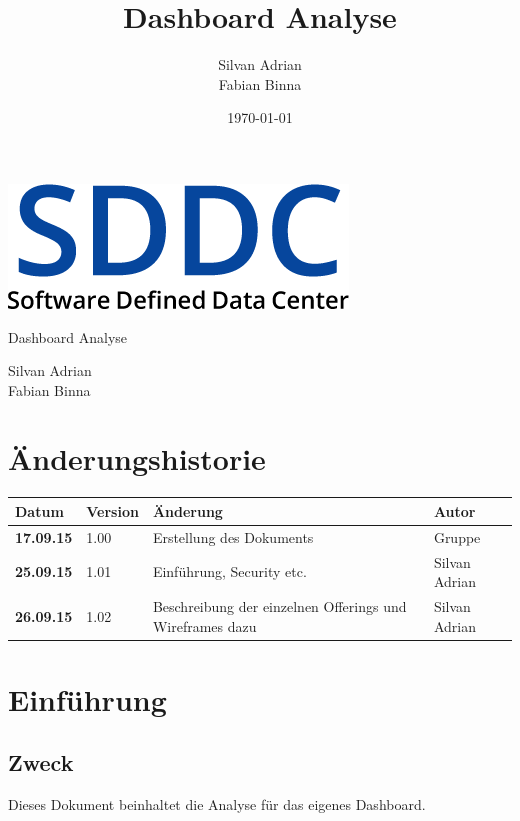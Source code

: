 \documentclass[11pt]{scrartcl}
\title{Dashboard Analyse}
\author{Silvan Adrian \\ Fabian Binna}
\date{\today{}}
\begin{document}
\def\arraystretch{1.5}
\begin{titlepage}
\begin{center}
\vspace{10em}
\includegraphics[scale=2]{SDDC}
\vspace{10em}
\end{center}
\begin{center}
\huge {Dashboard Analyse}
\end{center}
\begin{center}
\vspace{10em}
\LARGE {Silvan Adrian} \\
\LARGE {Fabian Binna}
\end{center}

\end{titlepage}

\newpage
\section{Änderungshistorie}
\begin{tabularx}{\linewidth}{l l X l}
\textbf{Datum} & \textbf{Version} & \textbf{Änderung}  & \textbf{Autor} \\
\hline
\textbf{17.09.15} & 1.00 & Erstellung des Dokuments & Gruppe \\
\textbf{25.09.15} & 1.01 & Einführung, Security etc. & Silvan Adrian \\
\textbf{26.09.15} & 1.02 & Beschreibung der einzelnen Offerings und Wireframes 
dazu & Silvan Adrian\\

\end{tabularx}

\newpage
\tableofcontents
\newpage

\section{Einführung}
\subsection{Zweck}
Dieses Dokument beinhaltet die Analyse für das eigenes Dashboard.
\end{document}
